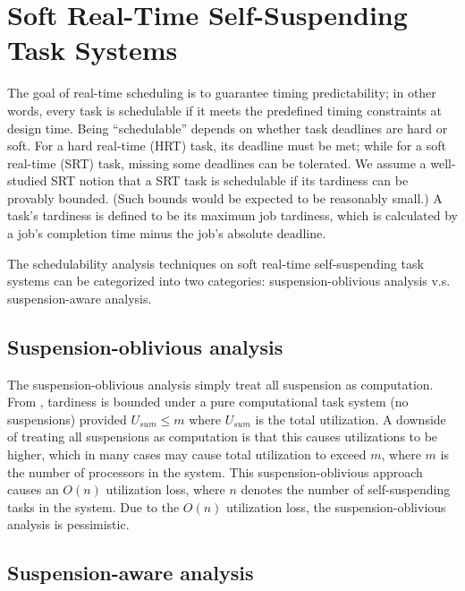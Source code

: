 \section{Soft Real-Time Self-Suspending Task Systems}
\label{sec:soft-realtime}

The goal of real-time scheduling is to guarantee timing predictability; in other words, every task is schedulable if it meets the predefined timing constraints at design time. Being ``schedulable'' depends on whether task deadlines are hard or soft. 
For a hard real-time (HRT) task, its deadline must be met; while for a soft real-time (SRT) task, missing some deadlines can be tolerated. We assume a well-studied SRT notion that a SRT task is schedulable if its tardiness can be provably bounded. (Such bounds would be expected to be reasonably small.) A task's tardiness is defined to be its maximum job tardiness, which is calculated by a job's completion time minus the job's absolute deadline.

The schedulability analysis techniques on soft real-time self-suspending task systems can be categorized into two categories: suspension-oblivious analysis v.s. suspension-aware analysis.

\subsection{Suspension-oblivious analysis}
\label{sec:sus-oblivious-soft}

 The suspension-oblivious analysis simply treat all suspension as computation. From \cite{Devi2005,Leontyev072}, tardiness is bounded under a pure computational task system (no suspensions) provided $U_{sum} \leq m$ where $U_{sum}$ is the total utilization. A downside of treating all suspensions as computation is that this causes utilizations to be higher, which in many cases may cause total utilization to exceed $m$, where $m$ is the number of processors in the system.  This suspension-oblivious approach causes an $O(n)$ utilization loss, where $n$ denotes the number of self-suspending tasks in the system. 
 Due to the $O(n)$ utilization loss, the suspension-oblivious analysis is pessimistic. 

\subsection{Suspension-aware analysis}
\label{sec:sus-aware-soft}

